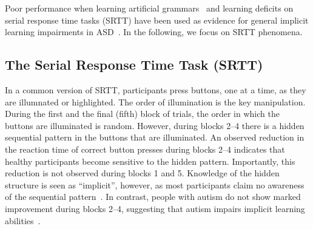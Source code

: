 Poor performance when learning artificial grammars~\cite{ReberAS:1967:Implicit} and learning deficits on serial response time tasks (SRTT) have been used as evidence for general implicit learning impairments in ASD~\cite{MostofskySH:2000:Procedural,KlingerLG:2006:Implicit}. In the following, we focus on SRTT phenomena.

\subsection{The Serial Response Time Task (SRTT)}


In a common version of SRTT, participants press buttons, one at a time, as they are illumnated or highlighted. The order of illumination is the key manipulation. During the first and the final (fifth) block of trials, the order in which the buttons are illuminated is random. However, during blocks 2--4 there is a hidden sequential pattern in the buttons that are illuminated. An observed reduction in the reaction time of correct button presses during blocks 2--4 indicates that healthy participants become sensitive to the hidden pattern. Importantly, this reduction is not observed during blocks 1 and 5. Knowledge of the hidden structure is seen as ``implicit'', however, as most participants claim no awareness of the sequential pattern~\cite{CleeremansA:1991:SSRT}. In contrast, people with autism do not show marked improvement during blocks 2--4, suggesting that autism impairs implicit learning abilities~\cite{MostofskySH:2000:Procedural}.

